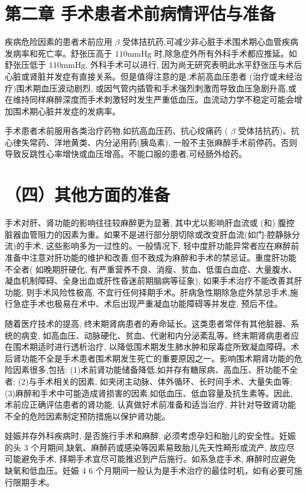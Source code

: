 \documentclass[10pt]{article}
\begin{document}
\section*{第二章 手术患者术前病情评估与准备}
疾病危险因素的患者术前应用 $\beta$ 受体拮抗药,可减少非心脏手术围术期心血管疾病发病率和死亡率。舒张压高于 $110 \mathrm{mmHg}$ 时,除急症外所有外科手术都应推延。如舒张压低于 $110 \mathrm{mmHg}$, 外科手术可以进行, 因为尚无研究表明此水平舒张压与术后心脏或肾脏并发症有直接关系。但是值得注意的是,术前高血压患者 (治疗或未经治疗)围术期血压波动剧烈, 或因气管内插管和手术强烈刺激而导致血压急剧升高,或在维持同样麻醉深度而手术刺激轻时发生严重低血压。血流动力学不稳定可能会增加围术期心脏并发症的发病率。

手术患者术前服用各类治疗药物,如抗高血压药、抗心绞痛药 ( $\beta$ 受体拮抗药)、抗心律失常药、洋地黄类、内分泌用药(胰岛素), 一般不主张麻醉手术前停药。否则导致反跳性心率增快或血压增高。不能口服的患者,可经肠外给药。

\section*{（四）其他方面的准备}
手术对肝、肾功能的影响往往较麻醉更为显著, 其中尤以影响肝血流或 (和) 腹控脏器血管阻力的因素为重。如果不是进行部分朋切除或改变肝血流(如门-腔静脉分流)的手术, 这些影响多为一过性的。一般情况下, 轻中度肝功能异常者应在麻醉前准备中注意对肝功能的维护和改善,但不致成为麻醉和手术的禁忌证。重度肝功能不全者( 如晚期肝硬化, 有严重营养不良、消瘦、贫血、低蛋白血症、大量腹水、凝血机制障碍、全身出血或肝性昏迷前期脑病等征象), 如果手术治疗不能改善其肝功能, 则手术风险性极高, 不宜行任何择期手术。肝病急性期除急症外禁忌手术,施行急症手术也极易在术中、术后出现严重凝血功能障碍等并发症, 预后不佳。

随着医疗技术的提高, 终末期肾病患者的寿命延长。这类患者常伴有其他脏器、系统的病变, 如高血压、动脉硬化、贫血、代谢和内分泌紊乱等。终末期肾病患者应在围术期适时进行透析治疗, 以降低围术期发生肺水肿和尿毒症所致凝血障碍。术后肾功能不全是手术患者围术期发生死亡的重要原因之一。影响围术期肾功能的危险因素很多,包括: (1)术前肾功能储备降低,如并存有糖尿病、高血压、肝功能不全者; (2)与手术相关的因素, 如夹闭主动脉、体外循环、长时间手术、大量失血等; (3)麻醉和手术中可能造成肾损害的因素,如低血压、低血容量及抗生素等。因此, 术前应正确评估患者的肾功能, 认真做好术前准备和适当治疗, 并针对导致肾功能不全的危险因素制定预防措施以保护肾功能。

娃娠并存外科疾病时, 是否施行手术和麻醉, 必须考虑孕妇和胎儿的安全性。妊娠的头 3 个月期间,缺氧、麻醉药或感染等因素易致胎儿先天性畸形或流产, 故应尽可能避免手术, 择期手术宜尽可能推迟到产后施行。如系急症手术, 麻醉时应避免缺氧和低血压。妊娠 4 6 个月期间一般认为是手术治疗的最佳时机，如有必要可施行限期手术。
\end{document}

